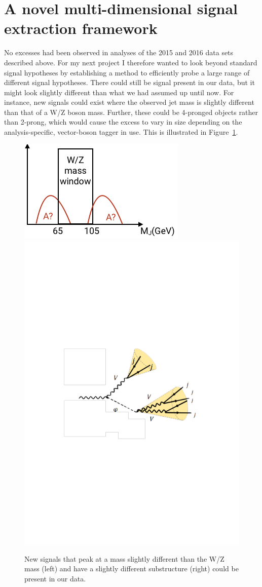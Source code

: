 \documentclass{pasa}%
\begin{document}
\section{A novel multi-dimensional signal extraction framework}
\label{sec:yearIII}
No excesses had been observed in analyses of the 2015 and 2016 data sets described above. For my next project I therefore wanted to look beyond standard signal hypotheses by establishing a method to efficiently probe a large range of different signal hypotheses. There could still be signal present in our data, but it might look slightly different than what we had assumed up until now. For instance, new signals could exist where the observed jet mass is slightly different than that of a W/Z boson mass. Further, these could be 4-pronged objects rather than 2-prong, which would cause the excess to vary in size depending on the analysis-specific, vector-boson tagger in use. This is illustrated in Figure~\ref{Fig4}.
\begin{figure}[h!]
\centering
 \includegraphics[width=0.49\columnwidth]{figures/tails.png}
 \includegraphics[width=0.49\columnwidth]{figures/triboson2.pdf}
\caption{New signals that peak at a mass slightly different than the W/Z mass (left) and have a slightly different substructure (right) could be present in our data.}
\label{Fig4}
\end{figure}
\end{document}
